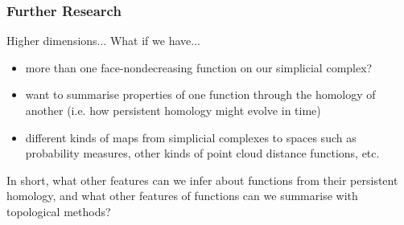 \documentclass{beamer}
\theoremstyle{definition}
\numberwithin{theorem}{section}
\begin{document}
\begin{frame}
\frametitle{Further Research}
\begin{block}{Higher dimensions...}
What if we have...
\begin{itemize}
	\item more than one face-nondecreasing function on our simplicial complex?
	\item want to summarise properties of one function through the homology of another (i.e. how persistent homology might evolve in time)
	\item different kinds of maps from simplicial complexes to spaces such as probability measures, other kinds of point cloud distance functions, etc.
\end{itemize}
In short, what other features can we infer about functions from their persistent homology, and what other features of functions can we summarise with topological methods?
\end{block}
\end{frame}
\end{document}
